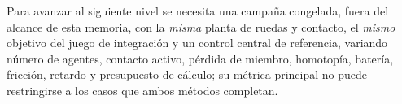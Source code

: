 Para avanzar al siguiente nivel se necesita una campaña congelada, fuera del
alcance de esta memoria, con la \emph{misma} planta de ruedas y contacto, el
\emph{mismo} objetivo del juego de integración y un control central de
referencia, variando número de agentes, contacto activo, pérdida de miembro,
homotopía, batería, fricción, retardo y presupuesto de cálculo; su métrica
principal no puede restringirse a los casos que ambos métodos completan.
